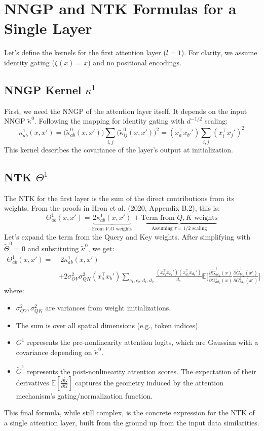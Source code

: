 \documentclass[10pt, a4paper]{article}
\newcommand{\E}{\mathbb{E}}
\begin{document}
\section{NNGP and NTK Formulas for a Single Layer}

Let's define the kernels for the first attention layer ($l=1$). For clarity, we assume identity gating ($\zeta(x)=x$) and no positional encodings.

\subsection{NNGP Kernel $\kappa^1$}
First, we need the NNGP of the attention layer itself. It depends on the input NNGP $\tilde\kappa^0$. Following the mapping for identity gating with $d^{-1/2}$ scaling:
\[
\kappa^1_{ab}(x,x') = \big(\tilde\kappa^0_{ab}(x,x')\big) \sum_{i,j} \big(\tilde\kappa^0_{ij}(x,x')\big)^2 = (x_a^\top x_{b'}') \sum_{i,j} (x_i^\top x_{j}')^2
\]
This kernel describes the covariance of the layer's output at initialization.

\subsection{NTK $\Theta^1$}
The NTK for the first layer is the sum of the direct contributions from its weights. From the proofs in Hron et al. (2020, Appendix B.2), this is:
\[
\Theta^1_{ab}(x,x') = \underbrace{2\kappa^1_{ab}(x,x')}_{\text{From } V, O \text{ weights}} + \underbrace{\text{Term from } Q, K \text{ weights}}_{\text{Assuming } \tau=1/2 \text{ scaling}}
\]
Let's expand the term from the Query and Key weights. After simplifying with $\tilde\Theta^0=0$ and substituting $\tilde\kappa^0$, we get:
\begin{align*}
\Theta^1_{ab}(x,x') = & \; 2\kappa^1_{ab}(x,x') \\
& + 2 \sigma_{OV}^2 \sigma_{QK}^2 (x_a^\top x_{b}') \sum_{c_1,c_2,d_1,d_2} \frac{(x_{c_1}^\top x_{c_2}') (x_{d_1}^\top x_{d_2}')}{d_s} \mathbb{E}\bigg[ \frac{\partial \tilde{G}_{ac_1}^1(x)}{\partial G_{ad_1}^1(x)} \frac{\partial \tilde{G}_{bc_2}^1(x')}{\partial G_{bd_2}^1(x')} \bigg]
\end{align*}
where:
\begin{itemize}
    \item $\sigma_{OV}^2, \sigma_{QK}^2$ are variances from weight initializations.
    \item The sum is over all spatial dimensions (e.g., token indices).
    \item $G^1$ represents the pre-nonlinearity attention logits, which are Gaussian with a covariance depending on $\tilde\kappa^0$.
    \item $\tilde G^1$ represents the post-nonlinearity attention scores. The expectation of their derivatives $\E[\frac{\partial\tilde G}{\partial G}]$ captures the geometry induced by the attention mechanism's gating/normalization function.
\end{itemize}

This final formula, while still complex, is the concrete expression for the NTK of a single attention layer, built from the ground up from the input data similarities.
\end{document}
